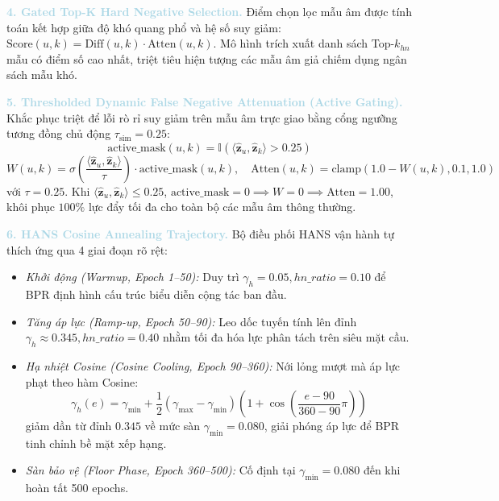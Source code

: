 \noindent\textcolor{lightblue}{\textbf{4. Gated Top-K Hard Negative Selection.}}
Điểm chọn lọc mẫu âm được tính toán kết hợp giữa độ khó quang phổ và hệ số suy giảm: $\text{Score}(u, k) = \text{Diff}(u, k) \cdot \text{Atten}(u, k)$. Mô hình trích xuất danh sách Top-$k_{hn}$ mẫu có điểm số cao nhất, triệt tiêu hiện tượng các mẫu âm giả chiếm dụng ngân sách mẫu khó.

\noindent\textcolor{lightblue}{\textbf{5. Thresholded Dynamic False Negative Attenuation (Active Gating).}}
Khắc phục triệt để lỗi rò rỉ suy giảm trên mẫu âm trực giao bằng cổng ngưỡng tương đồng chủ động $\tau_{\text{sim}} = 0.25$:
\begin{equation}
\text{active\_mask}(u, k) = \mathbb{I}(\langle \hat{\mathbf{z}}_u, \hat{\mathbf{z}}_k \rangle > 0.25)
\end{equation}
\begin{equation}
W(u, k) = \sigma\left(\frac{\langle \hat{\mathbf{z}}_u, \hat{\mathbf{z}}_k \rangle}{\tau}\right) \cdot \text{active\_mask}(u, k), \quad \text{Atten}(u, k) = \text{clamp}(1.0 - W(u, k), 0.1, 1.0)
\end{equation}
với $\tau = 0.25$. Khi $\langle \hat{\mathbf{z}}_u, \hat{\mathbf{z}}_k \rangle \le 0.25$, $\text{active\_mask} = 0 \implies W = 0 \implies \text{Atten} = 1.00$, khôi phục $100\%$ lực đẩy tối đa cho toàn bộ các mẫu âm thông thường.

\noindent\textcolor{lightblue}{\textbf{6. HANS Cosine Annealing Trajectory.}}
Bộ điều phối HANS vận hành tự thích ứng qua 4 giai đoạn rõ rệt:
\begin{itemize}[leftmargin=*]
    \item \textit{Khởi động (Warmup, Epoch 1--50):} Duy trì $\gamma_h = 0.05, hn\_ratio = 0.10$ để BPR định hình cấu trúc biểu diễn cộng tác ban đầu.
    \item \textit{Tăng áp lực (Ramp-up, Epoch 50--90):} Leo dốc tuyến tính lên đỉnh $\gamma_h \approx 0.345, hn\_ratio = 0.40$ nhằm tối đa hóa lực phân tách trên siêu mặt cầu.
    \item \textit{Hạ nhiệt Cosine (Cosine Cooling, Epoch 90--360):} Nới lỏng mượt mà áp lực phạt theo hàm Cosine:
    \begin{equation}
    \gamma_h(e) = \gamma_{\text{min}} + \frac{1}{2}(\gamma_{\text{max}} - \gamma_{\text{min}})\left(1 + \cos\left(\frac{e - 90}{360 - 90}\pi\right)\right)
    \end{equation}
    giảm dần từ đỉnh $0.345$ về mức sàn $\gamma_{\text{min}} = 0.080$, giải phóng áp lực để BPR tinh chỉnh bề mặt xếp hạng.
    \item \textit{Sàn bảo vệ (Floor Phase, Epoch 360--500):} Cố định tại $\gamma_{\text{min}} = 0.080$ đến khi hoàn tất 500 epochs.
\end{itemize}

